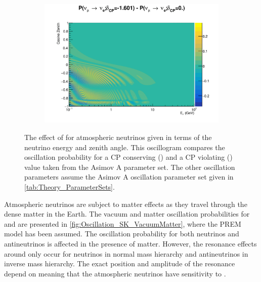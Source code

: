 \begin{figure}[h]
  \begin{subfigure}[t]{\textwidth}
    \includegraphics[width=\textwidth, trim={0mm 0mm 0mm 0mm}, clip,page=1]{Figures/Oscillation/AtmDCPSens.pdf}
  \end{subfigure}
  \caption{The effect of \dcp for atmospheric neutrinos given in terms of the neutrino energy and zenith angle. This oscillogram compares the  oscillation probability for a CP conserving () and a CP violating () value taken from the Asimov A parameter set. The other oscillation parameters assume the Asimov A oscillation parameter set given in \autoref{tab:Theory_ParameterSets}.}
  \label{fig:Oscillation_SK_DCPSensitivity}
\end{figure}

Atmospheric neutrinos are subject to matter effects as they travel through the dense matter in the Earth. The vacuum and matter oscillation probabilities for  and  are presented in \autoref{fig:Oscillation_SK_VacuumMatter}, where the PREM model has been assumed. The oscillation probability for both neutrinos and antineutrinos is affected in the presence of matter. However, the resonance effects around  only occur for neutrinos in normal mass hierarchy and antineutrinos in inverse mass hierarchy. The exact position and amplitude of the resonance depend on \sinsqatm meaning that the atmospheric neutrinos have sensitivity to \sinsqatm.

